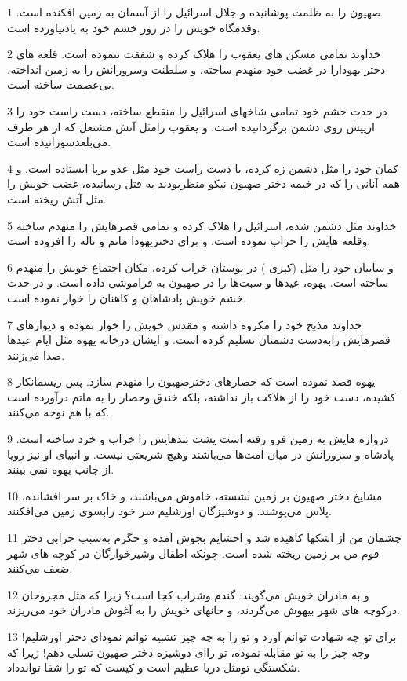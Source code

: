 \par 1 صهیون را به ظلمت پوشانیده و جلال اسرائیل را از آسمان به زمین افکنده است. وقدمگاه خویش را در روز خشم خود به یادنیاورده است.
\par 2 خداوند تمامی مسکن های یعقوب را هلاک کرده و شفقت ننموده است. قلعه های دختر یهودارا در غضب خود منهدم ساخته، و سلطنت وسرورانش را به زمین انداخته، بی‌عصمت ساخته است.
\par 3 در حدت خشم خود تمامی شاخهای اسرائیل را منقطع ساخته، دست راست خود را ازپیش روی دشمن برگردانیده است. و یعقوب رامثل آتش مشتعل که از هر طرف می‌بلعدسوزانیده است.
\par 4 کمان خود را مثل دشمن زه کرده، با دست راست خود مثل عدو برپا ایستاده است. و همه آنانی را که در خیمه دختر صهیون نیکو منظربودند به قتل رسانیده، غضب خویش را مثل آتش ریخته است.
\par 5 خداوند مثل دشمن شده، اسرائیل را هلاک کرده و تمامی قصرهایش را منهدم ساخته وقلعه هایش را خراب نموده است. و برای دختریهودا ماتم و ناله را افزوده است.
\par 6 و سایبان خود را مثل (کپری ) در بوستان خراب کرده، مکان اجتماع خویش را منهدم ساخته است. یهوه، عیدها و سبت‌ها را در صهیون به فراموشی داده است. و در حدت خشم خویش پادشاهان و کاهنان را خوار نموده است.
\par 7 خداوند مذبح خود را مکروه داشته و مقدس خویش را خوار نموده و دیوارهای قصرهایش رابه‌دست دشمنان تسلیم کرده است. و ایشان درخانه یهوه مثل ایام عیدها صدا می‌زنند.
\par 8 یهوه قصد نموده است که حصارهای دخترصهیون را منهدم سازد. پس ریسمانکار کشیده، دست خود را از هلاکت باز نداشته، بلکه خندق وحصار را به ماتم درآورده است که با هم نوحه می‌کنند.
\par 9 دروازه هایش به زمین فرو رفته است پشت بندهایش را خراب و خرد ساخته است. پادشاه و سرورانش در میان امت‌ها می‌باشند وهیچ شریعتی نیست. و انبیای او نیز رویا از جانب یهوه نمی بینند.
\par 10 مشایخ دختر صهیون بر زمین نشسته، خاموش می‌باشند، و خاک بر سر افشانده، پلاس می‌پوشند. و دوشیزگان اورشلیم سر خود رابسوی زمین می‌افکنند.
\par 11 چشمان من از اشکها کاهیده شد و احشایم بجوش آمده و جگرم به‌سبب خرابی دختر قوم من بر زمین ریخته شده است. چونکه اطفال وشیرخوارگان در کوچه های شهر ضعف می‌کنند.
\par 12 و به مادران خویش می‌گویند: گندم وشراب کجا است؟ زیرا که مثل مجروحان درکوچه های شهر بیهوش می‌گردند، و جانهای خویش را به آغوش مادران خود می‌ریزند.
\par 13 برای تو چه شهادت توانم آورد و تو را به چه چیز تشبیه توانم نمود‌ای دختر اورشلیم! وچه چیز را به تو مقابله نموده، تو را‌ای دوشیزه دختر صهیون تسلی دهم! زیرا که شکستگی تومثل دریا عظیم است و کیست که تو را شفا تواندداد.
